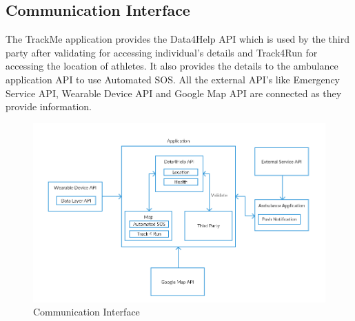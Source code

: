 \subsection{Communication Interface}
The TrackMe application provides the Data4Help API which is used by the third party after validating for accessing individual's details and Track4Run for accessing the location of athletes. It also provides the details to the ambulance application API to use Automated SOS. All the external API's like Emergency Service API, Wearable Device API and Google Map API are connected as they provide information.
\begin{figure}[H]
	\centering	
		\includegraphics[width=\linewidth]		{./RASD_Diagrams/CommunicationInterface.png}
      	\caption{Communication Interface}
        \label{TrackMe_comint}
\end{figure}
